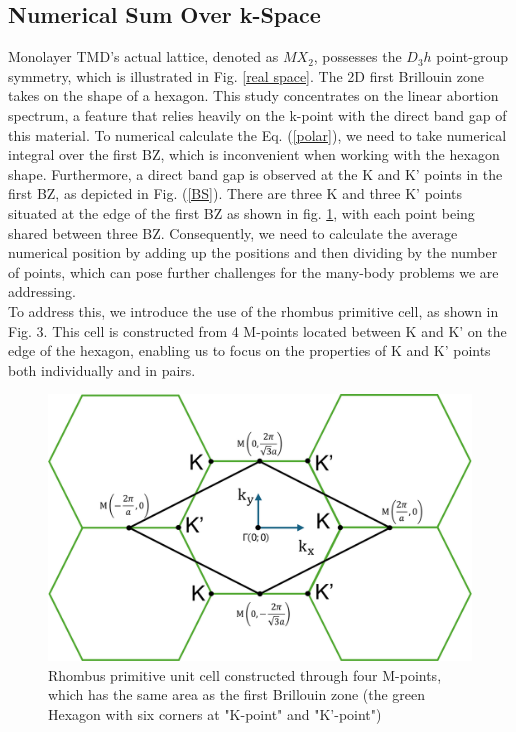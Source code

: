 \documentclass[12pt,english,a4paper]{article}
\begin{document}
\subsection{Numerical Sum Over k-Space}
\quad Monolayer TMD's actual lattice, denoted as $MX_2$, possesses the $D_3h$ point-group symmetry, which is illustrated in Fig. \ref{real space}. The 2D first Brillouin zone takes on the shape of a hexagon. This study concentrates on the linear abortion spectrum, a feature that relies heavily on the k-point with the direct band gap of this material. To numerical calculate the Eq. (\ref{polar}), we need to take numerical integral over the first BZ, which is inconvenient when working with the hexagon shape. Furthermore, a direct band gap is observed at the K and K' points in the first BZ, as depicted in Fig. (\ref{BS}). There are three K and three K' points situated at the edge of the first BZ as shown in fig. \ref{Rhombus}, with each point being shared between three BZ. Consequently, we need to calculate the average numerical position by adding up the positions and then dividing by the number of points, which can pose further challenges for the many-body problems we are addressing.\\\null
\quad To address this, we introduce the use of the rhombus primitive cell, as shown in Fig. 3. This cell is constructed from 4 M-points located between K and K' on the edge of the hexagon, enabling us to focus on the properties of K and K' points both individually and in pairs.
\begin{figure}[h]
	\begin{center}
\includegraphics[width= 0.75\linewidth]{Images/Rhombus.pdf}
\caption[Rhombus primitive unit cell in compare with hexagon primitive unit cell (the first Brillouin zone)]{Rhombus primitive unit cell constructed through four M-points, which has the same area as the first Brillouin zone (the green Hexagon with six corners at "K-point" and "K'-point")}
\label{Rhombus}
	\end{center}
\end{figure}\\\null
\end{document}
